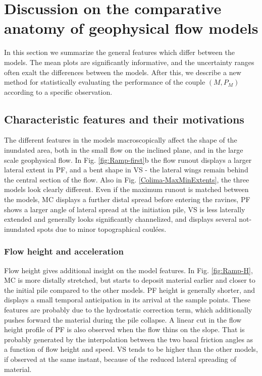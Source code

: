 \documentclass{article}
\begin{document}
\section{Discussion on the comparative anatomy of geophysical flow models}
In this section we summarize the general features which differ between the models. The mean plots are significantly informative, and the uncertainty ranges often exalt the differences between the models. After this, we describe a new method for statistically evaluating the performance of the couple $\left(M, P_M\right)$ according to a specific observation.

\subsection{Characteristic features and their motivations}
The different features in the models macroscopically affect the shape of the inundated area, both in the small flow on the inclined plane, and in the large scale geophysical flow. In Fig. \ref{fig:Ramp-first}b the flow runout displays a larger lateral extent in PF, and a bent shape in VS - the lateral wings remain behind the central section of the flow. Also in Fig. \ref{Colima-MaxMinExtents}, the three models look clearly different. Even if the maximum runout is matched between the models, MC displays a further distal spread before entering the ravines, PF shows a larger angle of lateral spread at the initiation pile, VS is less laterally extended and generally looks significantly channelized, and displays several not-inundated spots due to minor topographical coul\'{e}es.

\subsubsection{Flow height and acceleration}
Flow height gives additional insight on the model features. In Fig. \ref{fig:Ramp-H}, MC is more distally stretched, but starts to deposit material earlier and closer to the initial pile compared to the other models. PF height is generally shorter, and displays a small temporal anticipation in its arrival at the sample points. These features are probably due to the hydrostatic correction term, which additionally pushes forward the material during the pile collapse. A linear cut in the flow height profile of PF is also observed when the flow thins on the slope. That is probably generated by the interpolation between the two basal friction angles as a function of flow height and speed. VS tends to be higher than the other models, if observed at the same instant, because of the reduced lateral spreading of material. 
\end{document}
